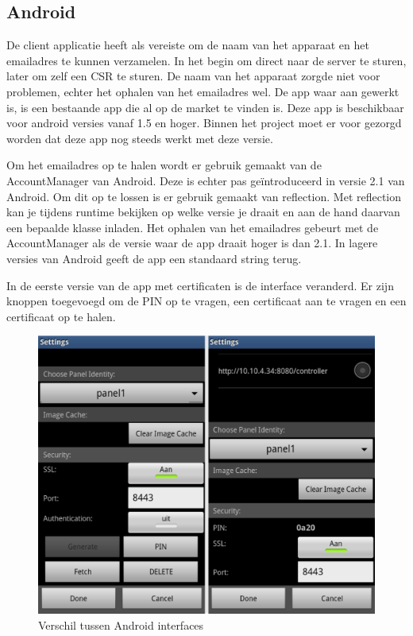 \documentclass[]{article}
\begin{document}
\subsection{Android}
De client applicatie heeft als vereiste om de naam van het apparaat en het
emailadres te kunnen verzamelen. In het
begin om direct naar de server te sturen, later om zelf een CSR te sturen. De
naam van het apparaat zorgde niet voor problemen, echter het ophalen van het
emailadres wel. De app waar aan gewerkt is, is een bestaande app die al op de
market te vinden is. Deze app is beschikbaar voor android versies vanaf 1.5 en
hoger. Binnen het project moet er voor gezorgd worden dat deze app nog steeds
werkt met deze versie.

Om het emailadres op te halen wordt er gebruik gemaakt van de AccountManager van
Android. Deze is echter pas ge\"introduceerd in versie 2.1 van Android. Om dit
op te lossen is er gebruik gemaakt van reflection. Met reflection kan je tijdens
runtime bekijken op welke versie je draait en aan de hand daarvan een bepaalde
klasse inladen. Het ophalen van het
emailadres gebeurt met de AccountManager als de versie waar de app draait hoger
is dan 2.1. In lagere versies van Android geeft de app een standaard string
terug.

In de eerste versie van de app met certificaten is de interface veranderd. Er
zijn knoppen toegevoegd om de PIN op te vragen, een certificaat aan te vragen en
een certificaat op te halen.

\begin{figure}[htpb]
   \begin{center}
     \includegraphics[height=0.4\textheight]{device-android.pdf}
   \end{center}
   \caption{Verschil tussen Android interfaces}
   \label{androidv2}
\end{figure}
\end{document}
